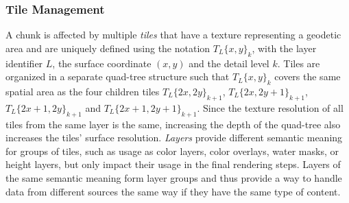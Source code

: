 \documentclass[journal]{vgtc}                %
\begin{document}
\subsubsection{Tile Management} \label{sec:tilemgmt}

A chunk is affected by multiple \emph{tiles} that have a texture representing a geodetic area and are uniquely defined using the notation $T_L\{x,y\}_k$, with the layer identifier $L$, the surface coordinate $\left( x,y \right)$ and the detail level $k$.
Tiles are organized in a separate quad-tree structure such that $T_L\{x,y\}_k$ covers the same spatial area as the four children tiles $T_L\{2x,2y\}_{k+1}$, $T_L\{2x,2y+1\}_{k+1}$, $T_L\{2x+1,2y\}_{k+1}$ and $T_L\{2x+1,2y+1\}_{k+1}$.
Since the texture resolution of all tiles from the same layer is the same, increasing the depth of the quad-tree also increases the tiles' surface resolution.
\emph{Layers} provide different semantic meaning for groups of tiles, such as usage as color layers, color overlays, water masks, or height layers, but only impact their usage in the final rendering steps.
Layers of the same semantic meaning form layer groups and thus provide a way to handle data from different sources the same way if they have the same type of content.
\end{document}
